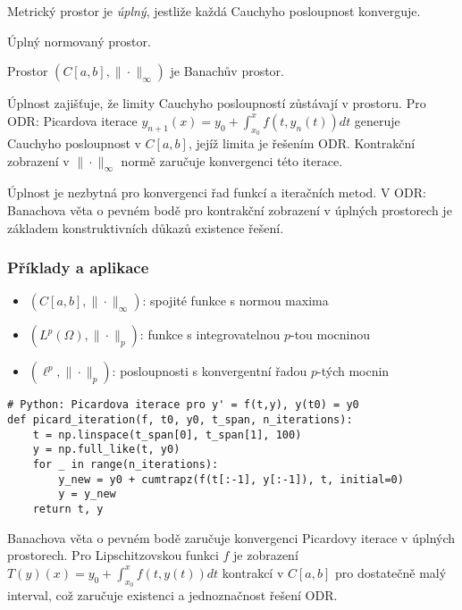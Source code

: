 \begin{definition}
Metrický prostor je \emph{úplný}, jestliže každá Cauchyho posloupnost konverguje.
\end{definition}

\begin{definition}
Úplný normovaný prostor.
\end{definition}

\begin{theorem}[O úplnosti]
Prostor $(C[a,b], \|\cdot\|_\infty)$ je Banachův prostor.
\end{theorem}

\begin{intuition}
Úplnost zajišťuje, že limity Cauchyho posloupností zůstávají v prostoru. Pro ODR: Picardova iterace $y_{n+1}(x) = y_0 + \int_{x_0}^x f(t,y_n(t))dt$ generuje Cauchyho posloupnost v $C[a,b]$, jejíž limita je řešením ODR. Kontrakční zobrazení v $\|\cdot\|_\infty$ normě zaručuje konvergenci této iterace.
\end{intuition}

\begin{keyinsight}
Úplnost je nezbytná pro konvergenci řad funkcí a iteračních metod. V ODR: Banachova věta o pevném bodě pro kontrakční zobrazení v úplných prostorech je základem konstruktivních důkazů existence řešení.
\end{keyinsight}

\subsubsection{Příklady a aplikace}

\begin{example}
\begin{itemize}
\item $(C[a,b], \|\cdot\|_\infty)$: spojité funkce s normou maxima
\item $(L^p(\Omega), \|\cdot\|_p)$: funkce s integrovatelnou $p$-tou mocninou
\item $(\ell^p, \|\cdot\|_p)$: posloupnosti s konvergentní řadou $p$-tých mocnin
\end{itemize}
\end{example}

\begin{application}
\begin{verbatim}
# Python: Picardova iterace pro y' = f(t,y), y(t0) = y0
def picard_iteration(f, t0, y0, t_span, n_iterations):
    t = np.linspace(t_span[0], t_span[1], 100)
    y = np.full_like(t, y0)
    for _ in range(n_iterations):
        y_new = y0 + cumtrapz(f(t[:-1], y[:-1]), t, initial=0)
        y = y_new
    return t, y
\end{verbatim}
Banachova věta o pevném bodě zaručuje konvergenci Picardovy iterace v úplných prostorech. Pro Lipschitzovskou funkci $f$ je zobrazení $T(y)(x) = y_0 + \int_{x_0}^x f(t,y(t))dt$ kontrakcí v $C[a,b]$ pro dostatečně malý interval, což zaručuje existenci a jednoznačnost řešení ODR.
\end{application}

